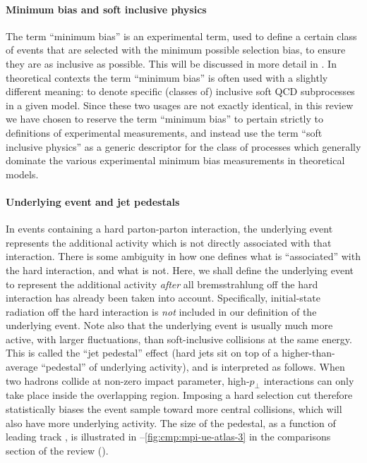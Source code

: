 \paragraph{Minimum bias and soft inclusive physics}
The term ``minimum bias'' is an experimental term, used to define a
certain class of events that are selected with the minimum
possible selection bias, to ensure they are as inclusive as possible. This will
be discussed in more detail in .
In theoretical contexts 
the term ``minimum bias'' is often used with a slightly different
meaning: to denote specific (classes of) inclusive soft QCD
subprocesses in a given model. 
Since these two usages are not exactly identical, in this review we have chosen to 
reserve the term ``minimum bias'' to pertain strictly to
definitions of experimental measurements, and instead use  
the term ``soft inclusive physics'' as a generic descriptor for the
class of processes which generally dominate the various experimental
minimum bias measurements in theoretical models.

\paragraph{Underlying event and jet pedestals} 
In events containing a hard parton-parton interaction, 
the underlying event represents the additional
activity which is not directly associated with that interaction. 
There is some ambiguity in how one defines what is
``associated'' with the hard interaction, and what is not. Here, we
shall define the underlying event to represent the additional
activity \emph{after} all bremsstrahlung off the hard interaction
has already been taken into account. Specifically, initial-state
radiation off the hard interaction is \emph{not} included in our
definition of the underlying event. Note also that the underlying
event is usually much more active, with larger fluctuations, than
 soft-inclusive collisions at the same energy. 
This is called the ``jet pedestal'' effect (hard jets sit on top of a
higher-than-average ``pedestal'' of underlying activity), and is
interpreted as follows. When two hadrons collide at non-zero impact
parameter, high-$p_\perp$ interactions can only take place  
inside the overlapping region. 
Imposing a hard selection cut therefore statistically
biases the event sample toward more central collisions, which will also
have more underlying activity. The size of the pedestal, as a function
of leading track \pt, is illustrated in
--\ref{fig:cmp:mpi-ue-atlas-3} in the
comparisons section of the review (). 

